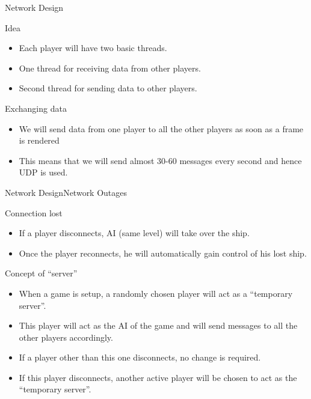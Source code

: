 \documentclass{beamer}
\begin{document}
\begin{frame}{Network Design}{}	
	\begin{block}{Idea}
		\begin{itemize}
			\item Each player will have two basic threads.
			\item One thread for receiving data from other players.
			\item Second thread for sending data to other players.
		\end{itemize}
	\end{block}

	\begin{block}{Exchanging data}
		\begin{itemize}
			\item We will send data from one player to all the other players as soon as a frame is rendered
			\item This means that we will send almost 30-60 messages every second and hence UDP is used.
		\end{itemize}
	\end{block}
\end{frame}

\begin{frame}{Network Design}{Network Outages}
	\begin{block}{Connection lost}
		\begin{itemize}
			\item If a player disconnects, AI (same level) will take over the ship.
			\item Once the player reconnects, he will automatically gain control of his lost ship.
		\end{itemize}
	\end{block}	
	\begin{block}{Concept of ``server''}
		\begin{itemize}
			\item When a game is setup, a randomly chosen player will act as a ``temporary server''.
			\item This player will act as the AI of the game and will send messages to all the other players accordingly.
			\item If a player other than this one disconnects, no change is required.
			\item If this player disconnects, another active player will be chosen to act as the ``temporary server''.
		\end{itemize}
	\end{block}
\end{frame}
\end{document}
